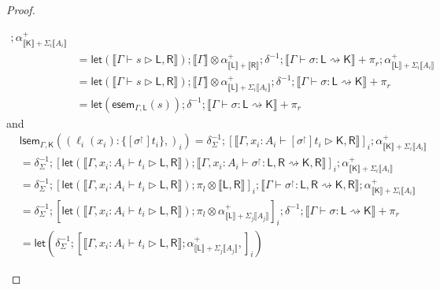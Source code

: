 \documentclass[acmsmall,screen,review]{acmart}
\newcommand{\ms}[1]{\ensuremath{\mathsf{#1}}}
\newcommand{\lto}{:}
\newcommand{\wbranch}[3]{#1(#2) \lto \{#3\}}
\newcommand{\rupg}[1]{{#1}^\upharpoonright}
\newcommand{\bhyp}[2]{#1 : #2}
\newcommand{\haslb}[3]{#1 \vdash #2 \rhd #3}
\newcommand{\lbsubst}[4]{#1 \vdash #2: #3 \rightsquigarrow #4}
\newcommand{\dnt}[1]{\llbracket{#1}\rrbracket}
\newcommand{\entrymor}[3]{\ms{esem}_{#1, #3}(#2)}
\newcommand{\loopmor}[3]{\ms{lsem}_{#1, #3}(#2)}
\newcommand{\lmor}[1]{\ms{let}(#1)}
\begin{document}
\begin{proof}
\begin{itemize}[leftmargin=*]
\begin{equation}
\begin{aligned}
          ; \alpha^+_{\dnt{\ms{K}} + \Sigma_i \dnt{A_i}} \\
        & = \lmor{\dnt{\haslb{\Gamma}{s}{\ms{L}, \ms{R}}}}
          ; \dnt{\Gamma} \otimes \alpha^+_{\dnt{\ms{L}} + \dnt{\ms{R}}} ; \delta^{-1} 
          ; \dnt{\lbsubst{\Gamma}{\sigma}{\ms{L}}{\ms{K}}} + \pi_r
          ; \alpha^+_{\dnt{\ms{L}} + \Sigma_i \dnt{A_i}} \\
        & = \lmor{\dnt{\haslb{\Gamma}{s}{\ms{L}, \ms{R}}}}
          ; \dnt{\Gamma} \otimes \alpha^+_{\dnt{\ms{L}} + \Sigma_i \dnt{A_i}} ; \delta^{-1} 
          ; \dnt{\lbsubst{\Gamma}{\sigma}{\ms{L}}{\ms{K}}} + \pi_r\\
        & = \lmor{\entrymor{\Gamma}{s}{\ms{L}}} 
          ; \delta^{-1} ; \dnt{\lbsubst{\Gamma}{\sigma}{\ms{L}}{\ms{K}}} + \pi_r
      \end{aligned}
    \end{equation}
    and
    \begin{equation}
      \begin{aligned}       
        & \loopmor{\Gamma}{(\wbranch{\ell_i}{x_i}{[\rupg{\sigma}]t_i},)_i}{\ms{K}} 
          = \delta^{-1}_{\Sigma} 
          ; [ \dnt{\haslb{\Gamma, \bhyp{x_i}{A_i}}{[\rupg{\sigma}]t_i}{\ms{K}, \ms{R}}} ]_i
          ; \alpha^+_{\dnt{\ms{K}} + \Sigma_i \dnt{A_i}} \\
        & = \delta^{-1}_{\Sigma} 
        ; [ 
            \lmor{\dnt{\haslb{\Gamma, \bhyp{x_i}{A_i}}{t_i}{\ms{L}, \ms{R}}}} 
            ; \dnt{\lbsubst{\Gamma, \bhyp{x_i}{A_i}}{\rupg{\sigma}}{\ms{L}, \ms{R}}{\ms{K}, \ms{R}}}
          ]_i
        ; \alpha^+_{\dnt{\ms{K}} + \Sigma_i \dnt{A_i}} \\
        & = \delta^{-1}_{\Sigma} 
        ; [ 
            \lmor{\dnt{\haslb{\Gamma, \bhyp{x_i}{A_i}}{t_i}{\ms{L}, \ms{R}}}} 
            ; \pi_l \otimes \dnt{\ms{L}, \ms{R}}
          ]_i
        ; \dnt{\lbsubst{\Gamma}{\rupg{\sigma}}{\ms{L}, \ms{R}}{\ms{K}, \ms{R}}}
        ; \alpha^+_{\dnt{\ms{K}} + \Sigma_i \dnt{A_i}} \\
        & = \delta^{-1}_{\Sigma} 
        ; [ 
            \lmor{\dnt{\haslb{\Gamma, \bhyp{x_i}{A_i}}{t_i}{\ms{L}, \ms{R}}}} 
            ; \pi_l \otimes \alpha^+_{\dnt{\ms{L}} + \Sigma_j \dnt{A_j}}
          ]_i
        ; \delta^{-1}
        ; \dnt{\lbsubst{\Gamma}{\sigma}{\ms{L}}{\ms{K}}} + \pi_r \\
        & = \lmor{
          \delta^{-1}_{\Sigma}
            ; [\dnt{\haslb{\Gamma, \bhyp{x_i}{A_i}}{t_i}{\ms{L}, \ms{R}}} 
                ; \alpha^+_{\dnt{\ms{L}} + \Sigma_j \dnt{A_j}},]_i }

\end{aligned}
\end{equation}
\end{itemize}
\end{proof}
\end{document}
